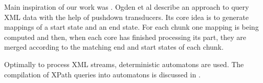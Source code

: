  Main inspiration of our work was \cite{Ogden2013}. Ogden et
al describe an approach to query XML data with the help of pushdown transducers.
Its core idea is to generate mappings of a start state and an end state. For
each chunk one mapping is being computed and then, when each core has finished
processing its part, they are merged according to the matching end and start
states of each chunk.

Optimally to process XML streams, deterministic automatons are used. The
compilation of XPath queries into automatons is discussed in \cite{Green2004}.


%

